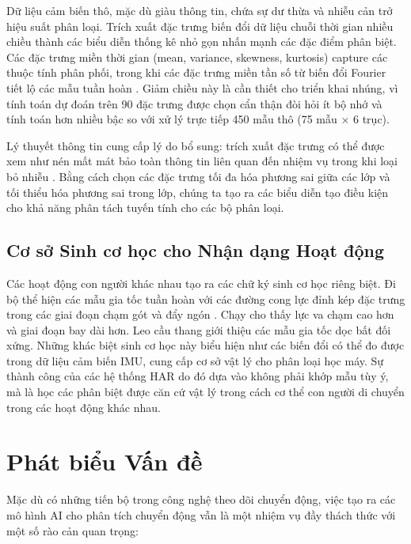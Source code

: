 Dữ liệu cảm biến thô, mặc dù giàu thông tin, chứa sự dư thừa và nhiễu cản trở hiệu suất phân loại. Trích xuất đặc trưng biến đổi dữ liệu chuỗi thời gian nhiều chiều thành các biểu diễn thống kê nhỏ gọn nhấn mạnh các đặc điểm phân biệt. Các đặc trưng miền thời gian (mean, variance, skewness, kurtosis) capture các thuộc tính phân phối, trong khi các đặc trưng miền tần số từ biến đổi Fourier tiết lộ các mẫu tuần hoàn \cite{oppenheim1999discrete}. Giảm chiều này là cần thiết cho triển khai nhúng, vì tính toán dự đoán trên 90 đặc trưng được chọn cẩn thận đòi hỏi ít bộ nhớ và tính toán hơn nhiều bậc so với xử lý trực tiếp 450 mẫu thô (75 mẫu × 6 trục).

Lý thuyết thông tin cung cấp lý do bổ sung: trích xuất đặc trưng có thể được xem như nén mất mát bảo toàn thông tin liên quan đến nhiệm vụ trong khi loại bỏ nhiễu \cite{cover2006elements}. Bằng cách chọn các đặc trưng tối đa hóa phương sai giữa các lớp và tối thiểu hóa phương sai trong lớp, chúng ta tạo ra các biểu diễn tạo điều kiện cho khả năng phân tách tuyến tính cho các bộ phân loại.

\subsection{Cơ sở Sinh cơ học cho Nhận dạng Hoạt động}

Các hoạt động con người khác nhau tạo ra các chữ ký sinh cơ học riêng biệt. Đi bộ thể hiện các mẫu gia tốc tuần hoàn với các đường cong lực đỉnh kép đặc trưng trong các giai đoạn chạm gót và đẩy ngón \cite{whittle2014gait}. Chạy cho thấy lực va chạm cao hơn và giai đoạn bay dài hơn. Leo cầu thang giới thiệu các mẫu gia tốc dọc bất đối xứng. Những khác biệt sinh cơ học này biểu hiện như các biến đổi có thể đo được trong dữ liệu cảm biến IMU, cung cấp cơ sở vật lý cho phân loại học máy. Sự thành công của các hệ thống HAR do đó dựa vào không phải khớp mẫu tùy ý, mà là học các phân biệt được căn cứ vật lý trong cách cơ thể con người di chuyển trong các hoạt động khác nhau.

\section{Phát biểu Vấn đề}

Mặc dù có những tiến bộ trong công nghệ theo dõi chuyển động, việc tạo ra các mô hình AI cho phân tích chuyển động vẫn là một nhiệm vụ đầy thách thức với một số rào cản quan trọng:

